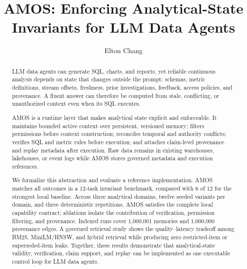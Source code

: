 \documentclass[sigconf,nonacm]{acmart}
\title{AMOS: Enforcing Analytical-State Invariants for LLM Data Agents}
\author{Elton Chang}
\affiliation{%
  \institution{Independent Researcher}
  \country{United States}
}
\newcommand{\amos}{\textsc{AMOS}\xspace}
\begin{document}
\sloppy

\begin{abstract}
LLM data agents can generate SQL, charts, and reports, yet reliable continuous analysis depends on state that changes outside the prompt: schemas, metric definitions, stream offsets, freshness, prior investigations, feedback, access policies, and provenance. A fluent answer can therefore be computed from stale, conflicting, or unauthorized context even when its SQL executes.

\amos is a runtime layer that makes analytical state explicit and enforceable. It maintains bounded active context over persistent, versioned memory; filters permissions before context construction; reconciles temporal and authority conflicts; verifies SQL and metric rules before execution; and attaches claim-level provenance and replay metadata after execution. Raw data remains in existing warehouses, lakehouses, or event logs while \amos stores governed metadata and execution references.

We formalize this abstraction and evaluate a reference implementation. \amos matches all outcomes in a 12-task invariant benchmark, compared with 6 of 12 for the strongest local baseline. Across three analytical domains, twelve seeded variants per domain, and three deterministic repetitions, \amos satisfies the complete local capability contract; ablations isolate the contribution of verification, permission filtering, and provenance. Indexed runs cover 1{,}000{,}001 memories and 1{,}000{,}000 provenance edges. A governed retrieval study shows the quality--latency tradeoff among BM25, MiniLM/HNSW, and hybrid retrieval while producing zero restricted-item or superseded-item leaks. Together, these results demonstrate that analytical-state validity, verification, claim support, and replay can be implemented as one executable control loop for LLM data agents.
\end{abstract}

\maketitle
\end{document}
